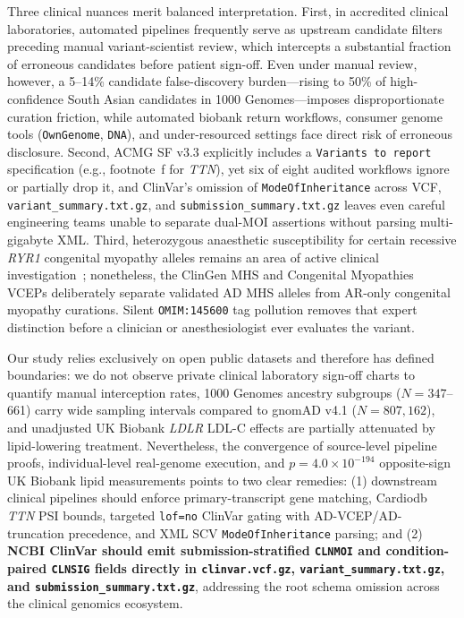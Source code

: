 \documentclass[11pt,letterpaper]{article}
\begin{document}
Three clinical nuances merit balanced interpretation. First, in accredited clinical laboratories, automated pipelines frequently serve as upstream candidate filters preceding manual variant-scientist review, which intercepts a substantial fraction of erroneous candidates before patient sign-off. Even under manual review, however, a 5--14\% candidate false-discovery burden---rising to 50\% of high-confidence South Asian candidates in 1000 Genomes---imposes disproportionate curation friction, while automated biobank return workflows, consumer genome tools (\texttt{OwnGenome}, \texttt{DNA}), and under-resourced settings face direct risk of erroneous disclosure. Second, ACMG SF v3.3 explicitly includes a \texttt{Variants to report} specification (e.g., footnote~f for \textit{TTN}), yet six of eight audited workflows ignore or partially drop it, and ClinVar's omission of \texttt{ModeOfInheritance} across VCF, \texttt{variant\_summary.txt.gz}, and \texttt{submission\_summary.txt.gz} leaves even careful engineering teams unable to separate dual-MOI assertions without parsing multi-gigabyte XML. Third, heterozygous anaesthetic susceptibility for certain recessive \textit{RYR1} congenital myopathy alleles remains an area of active clinical investigation~\citep{snoeck2015ryr1,johnston2021ryr1vcep}; nonetheless, the ClinGen MHS and Congenital Myopathies VCEPs deliberately separate validated AD MHS alleles from AR-only congenital myopathy curations. Silent \texttt{OMIM:145600} tag pollution removes that expert distinction before a clinician or anesthesiologist ever evaluates the variant.

Our study relies exclusively on open public datasets and therefore has defined boundaries: we do not observe private clinical laboratory sign-off charts to quantify manual interception rates, 1000 Genomes ancestry subgroups ($N=347$--661) carry wide sampling intervals compared to gnomAD v4.1 ($N=807{,}162$), and unadjusted UK Biobank \textit{LDLR} LDL-C effects are partially attenuated by lipid-lowering treatment. Nevertheless, the convergence of source-level pipeline proofs, individual-level real-genome execution, and $p=4.0\times 10^{-194}$ opposite-sign UK Biobank lipid measurements points to two clear remedies: (1) downstream clinical pipelines should enforce primary-transcript gene matching, Cardiodb \textit{TTN} PSI bounds, targeted \texttt{lof=no} ClinVar gating with AD-VCEP/AD-truncation precedence, and XML SCV \texttt{ModeOfInheritance} parsing; and (2) \textbf{NCBI ClinVar should emit submission-stratified \texttt{CLNMOI} and condition-paired \texttt{CLNSIG} fields directly in \texttt{clinvar.vcf.gz}, \texttt{variant\_summary.txt.gz}, and \texttt{submission\_summary.txt.gz}}, addressing the root schema omission across the clinical genomics ecosystem.
\end{document}
